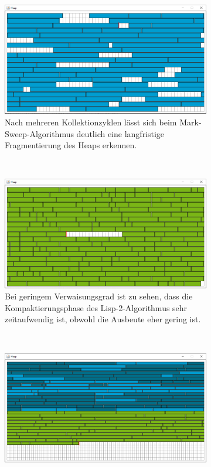 \begin{figure}[p]
	\centering
	\begin{subfigure}{\textwidth}
		\centering
		\includegraphics[scale=0.3]{img/gui/marksweep-simulation.png}
		\caption{Nach mehreren Kollektionzyklen lässt sich beim Mark-Sweep-Algorithmus deutlich eine langfristige Fragmentierung des Heaps erkennen.}
	\end{subfigure}\\[0.7cm]
	\begin{subfigure}{\textwidth}
		\centering
		\includegraphics[scale=0.3]{img/gui/lisp2-simulation.png}
		\caption{Bei geringem Verwaisungsgrad ist zu sehen, dass die Kompaktierungsphase des Lisp-2-Algorithmus sehr zeitaufwendig ist, obwohl die Ausbeute eher gering ist.}
	\end{subfigure}\\[0.7cm]
	\begin{subfigure}{\textwidth}
		\centering
		\includegraphics[scale=0.3]{img/gui/semispace-simulation.png}

\end{subfigure}
\end{figure}
